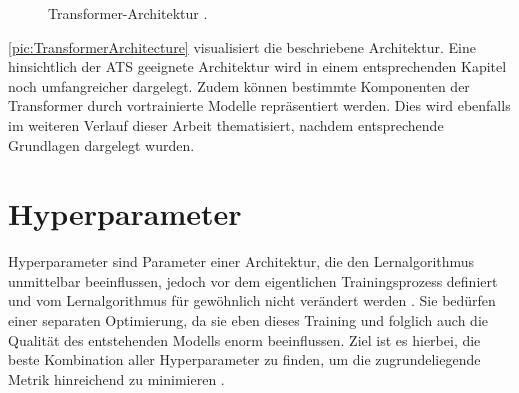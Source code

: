 \begin{figure}[h!]
  \centering
  \caption{Transformer-Architektur \cite[S.~3]{VAS17}.}
  \label{pic:TransformerArchitecture}
\end{figure}

\noindent
\autoref{pic:TransformerArchitecture} visualisiert die beschriebene Architektur. Eine hinsichtlich der \ac{ATS} geeignete Architektur wird in einem entsprechenden Kapitel noch umfangreicher dargelegt. Zudem können bestimmte Komponenten der Transformer durch vortrainierte Modelle repräsentiert werden. Dies wird ebenfalls im weiteren Verlauf dieser Arbeit thematisiert, nachdem entsprechende Grundlagen dargelegt wurden.
\newpage


\section{Hyperparameter}
\noindent
Hyperparameter sind Parameter einer Architektur, die den Lernalgorithmus unmittelbar beeinflussen, jedoch vor dem eigentlichen Trainingsprozess definiert und vom Lernalgorithmus für gewöhnlich nicht verändert werden \cite[S.~118]{GOO16}. Sie bedürfen einer separaten Optimierung, da sie eben dieses Training und folglich auch die Qualität des entstehenden Modells enorm beeinflussen. Ziel ist es hierbei, die beste Kombination aller Hyperparameter zu finden, um die zugrundeliegende Metrik hinreichend zu minimieren \cite[S.~1]{YAN20}.\\

